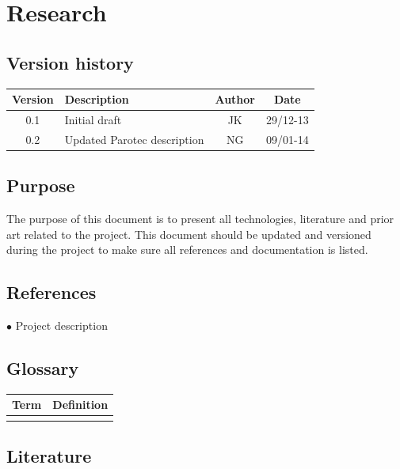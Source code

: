 \chapter{Research}
\section{Version history}
\begin{table}[H]
\begin{tabular}{|c|p{9cm}|c|c|}
\hline
Version & Description & Author & Date\\
\hline
0.1 & Initial draft & JK & 29/12-13\\
\hline
0.2 & Updated Parotec description & NG & 09/01-14\\
\hline
\end{tabular}
\end{table}

\section{Purpose}
The purpose of this document is to present all technologies, literature and prior art related to the project. This document should be updated and versioned during the project to make sure all references and documentation is listed.

\section{References}
$\bullet$ Project description

\section{Glossary}
\begin{table}[H]
\centering
\begin{tabular}{|p{4cm}|p{7cm}|}
\hline
Term & Definition\\ \hline
&\\ \hline
\end{tabular}
\end{table}

\section{Literature}


